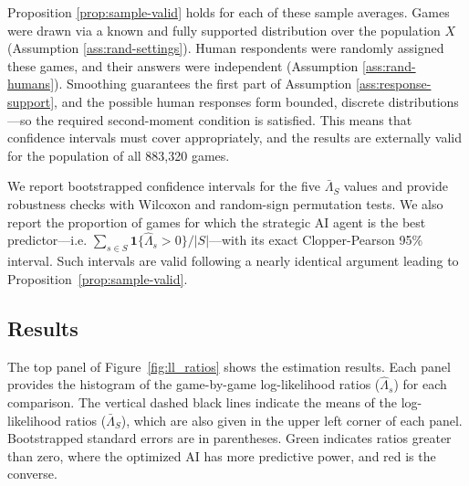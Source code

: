 \documentclass[11pt]{article}
\theoremstyle{definition}
\newcommand{\aisub}{AI agent}
\newcommand{\TotalGames}{883,320}
\begin{document}
Proposition \ref{prop:sample-valid} holds for each of these sample averages.
Games were drawn via a known and fully supported distribution over the population $X$ (Assumption \ref{ass:rand-settings}).
Human respondents were randomly assigned these games, and their answers were independent (Assumption \ref{ass:rand-humans}).
Smoothing guarantees the first part of Assumption \ref{ass:response-support}, and the possible human responses form bounded, discrete distributions---so the required second-moment condition is satisfied.
This means that confidence intervals must cover appropriately, and the results are externally valid for the population of all \TotalGames{} games.

We report bootstrapped confidence intervals for the five $\bar\Lambda_S$ values and provide robustness checks with Wilcoxon and random-sign permutation tests.
We also report the proportion of games for which the strategic \aisub{} is the best predictor---i.e. $\sum_{s \in S} \mathbf 1\{\hat \Lambda_s > 0\} / |S|$---with its exact Clopper-Pearson 95\% interval.
Such intervals are valid following a nearly identical argument leading to Proposition~\ref{prop:sample-valid}.

\subsection{Results}

The top panel of Figure~\ref{fig:ll_ratios} shows the estimation results.
Each panel provides the histogram of the game-by-game log-likelihood ratios ($\hat \Lambda_s$) for each comparison.
The vertical dashed black lines indicate the means of the log-likelihood ratios ($\bar \Lambda_S$), which are also given in the upper left corner of each panel.
Bootstrapped standard errors are in parentheses.
Green indicates ratios greater than zero, where the optimized AI has more predictive power, and red is the converse.
\end{document}
